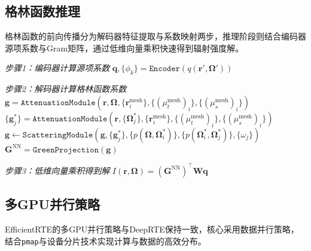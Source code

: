 \subsection{格林函数推理}

格林函数的前向传播分为解码器特征提取与系数映射两步，推理阶段则结合编码器源项系数与Gram矩阵，通过低维向量乘积快速得到辐射强度解。

\begin{algorithm}[htp!]
    \caption{格林函数推理}\label{alg:green_inference}
    \SetAlgoLined

    \BlankLine

    \emph{步骤1：编码器计算源项系数}\;
    $\boldsymbol{q}, \{\phi_k\} = \texttt{Encoder}(q(\boldsymbol{r}',\boldsymbol{\Omega}'))$\;

    \emph{步骤2：解码器计算格林函数系数}\;
    $\bm{g}=\texttt{AttenuationModule}(\boldsymbol{r},\boldsymbol{\Omega},\{\boldsymbol{r}_i^{\text{mesh}}\},\{{(\mu_t^{\text{mesh}})}_i\},\{{(\mu_s^{\text{mesh}})}_i\})$\;
    $\{\bm{g}^*_j\}=\texttt{AttenuationModule}(\boldsymbol{r},\{\boldsymbol{\Omega}_j^*\},\{\boldsymbol{r}_i^{\mathrm{mesh}}\},\{{(\mu_t^{\mathrm{mesh}})}_i\}, \{{(\mu_s^{\mathrm{mesh}})}_i\})$\;
    $\bm{g}\gets\texttt{ScatteringModule}(\bm{g}, \{\bm{g}^*_j\}, \{p(\boldsymbol{\Omega},\boldsymbol{\Omega}^*_i)\},\{p(\boldsymbol{\Omega}^*_i,\boldsymbol{\Omega}^*_j)\}, \{\omega_j\})$\;
    $\boldsymbol{G}^{\text{NN}} = \texttt{GreenProjection}(\bm{g})$\;

    \emph{步骤3：低维向量乘积得到解}\;
    $I(\boldsymbol{r},\boldsymbol{\Omega}) = (\boldsymbol{G}^{\text{NN}})^\top \boldsymbol{W} \boldsymbol{q}$\;

    \;
\end{algorithm}

\subsection{多GPU并行策略}

EfficientRTE的多GPU并行策略与DeepRTE保持一致，核心采用数据并行策略，结合\texttt{pmap}与设备分片技术实现计算与数据的高效分布。

